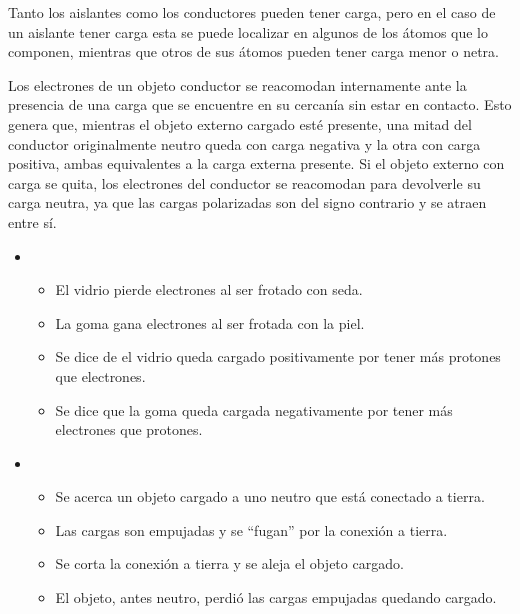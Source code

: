 \documentclass[a5paper,12pt,twoside]{book}
\begin{document}
Tanto los aislantes como los conductores pueden tener carga, pero en el caso de un aislante tener carga esta se puede localizar en algunos de los átomos que lo componen, mientras que otros de sus átomos pueden tener carga menor o netra.


Los electrones de un objeto conductor se reacomodan internamente ante la presencia de una carga que se encuentre en su cercanía sin estar en contacto.
Esto genera que, mientras el objeto externo cargado esté presente, una mitad del conductor originalmente neutro queda con carga negativa y la otra con carga positiva, ambas equivalentes a la carga externa presente.
Si el objeto externo con carga se quita, los electrones del conductor se reacomodan para devolverle su carga neutra, ya que las cargas polarizadas son del signo contrario y se atraen entre sí.

\begin{itemize}
    \item {}
    
    \begin{itemize}
        \item El vidrio pierde electrones al ser frotado con seda.
        \item La goma gana electrones al ser frotada con la piel.
        \item Se dice de el vidrio queda cargado positivamente por tener más protones que electrones.
        \item Se dice que la goma queda cargada negativamente por tener más electrones que protones.
    \end{itemize}

    \item {}
    
    \begin{itemize}
        \item Se acerca un objeto cargado a uno neutro que está conectado a tierra.
        \item Las cargas son empujadas y se ``fugan'' por la conexión a tierra.
        \item Se corta la conexión a tierra y se aleja el objeto cargado.
        \item El objeto, antes neutro, perdió las cargas empujadas quedando cargado.
    \end{itemize}

    \begin{center}
        \def\svgwidth{\linewidth}
        
    \end{center}
\end{itemize}
\end{document}
